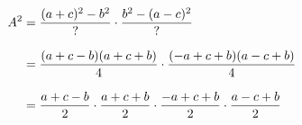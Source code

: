 \documentclass[preview]{standalone}
\begin{document}
\begin{align*}
\special{dvisvgm:raw <g id='unique000'>}A^2 &= \frac{(a+c)^2 - b^2}{?} \cdot \frac{b^2 - (a-c)^2}{?} \\[8pt] \special{dvisvgm:raw </g>}\special{dvisvgm:raw <g id='unique001'>}&= \frac{(a+c-b)(a+c+b)}{4} \cdot \frac{(-a+c+b)(a-c+b)}{4} \\[8pt] \special{dvisvgm:raw </g>}\special{dvisvgm:raw <g id='unique002'>}&= \frac{a+c-b}{2}\cdot\frac{a+c+b}{2}\cdot\frac{-a+c+b}{2}\cdot\frac{a-c+b}{2}\special{dvisvgm:raw </g>}
\end{align*}
\end{document}
